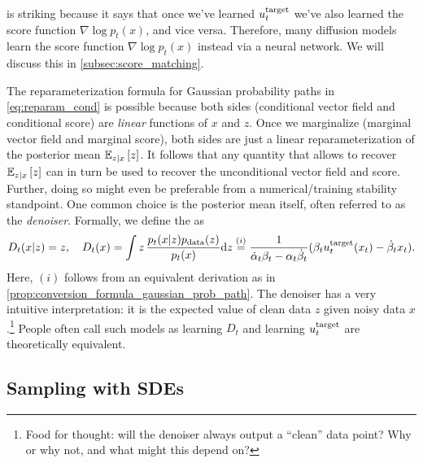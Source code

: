  is striking because it says that once we've learned $u^{\text{target}}_t$ we've also learned the  score function $\nabla\log p_t(x)$, and vice versa. Therefore, many diffusion models learn the score function $\nabla\log p_t(x)$ instead via a neural network. We will discuss this in \cref{subsec:score_matching}.
\begin{remarkbox}
The reparameterization formula for Gaussian probability paths in \cref{eq:reparam_cond} is possible because both sides (conditional vector field and conditional score) are \emph{linear} functions of $x$ and $z$. Once we marginalize (marginal vector field and marginal score), both sides are just a linear reparameterization of the posterior mean $\mathbb{E}_{z|x}\left[z\right]$. It follows that any quantity that allows to recover $\mathbb{E}_{z|x}\left[z\right]$ can in turn be used to recover the unconditional vector field and score. Further, doing so might even be preferable from a numerical/training stability standpoint. One common choice is the posterior mean itself, often referred to as the \textit{denoiser}. Formally, we define the  as
\begin{align}
\label{e:denoiser}
    D_t(x|z)=z, \quad 
D_t(x)
=\int z\,\frac{ p_t(x|z)p_{\rm{data}}(z)}{p_t(x)}\mathrm{d} z \overset{(i)}{=} \frac{1}{\dot{\alpha}_t\beta_t-\alpha_t\dot{\beta}_t}(\beta_t u^{\text{target}}_t(x_t)-\dot{\beta}_tx_t).
\end{align}
Here, $(i)$ follows from an equivalent derivation as in \cref{prop:conversion_formula_gaussian_prob_path}. The denoiser has a very intuitive interpretation: it is the expected value of clean data $z$ given noisy data $x$.\footnote{Food for thought: will the denoiser always output a ``clean'' data point? Why or why not, and what might this depend on?} People often call such models  as learning $D_t$ and learning $u^{\text{target}}_t$ are theoretically equivalent.
\end{remarkbox}


\subsection{Sampling with SDEs}

